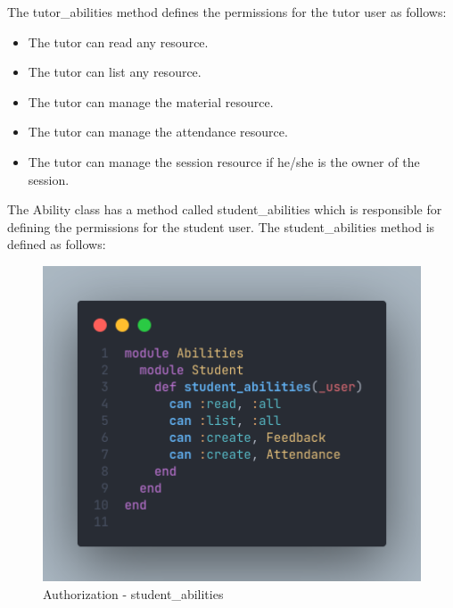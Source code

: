 \begin{justify}
            \vspace{0.25cm}
            \newendline The tutor\_abilities method defines the permissions for the tutor user as follows:
            
            \begin{itemize}
                \item The tutor can read any resource.
                \item The tutor can list any resource.
                \item The tutor can manage the material resource.
                \item The tutor can manage the attendance resource.
                \item The tutor can manage the session resource if he/she is the owner of the session.
            \end{itemize}

        \vspace{0.25cm}
        \newendline The Ability class has a method called student\_abilities which is responsible for defining the permissions for the student user. The student\_abilities method is defined as follows:
            
            \begin{figure}[H]
                \centerline{\includegraphics[width=150mm,scale=1]{figures/implementation_and_testing/implementation/backend/StudentAbilities.png}}
                \caption{Authorization - student\_abilities}
            \end{figure}


\end{justify}
